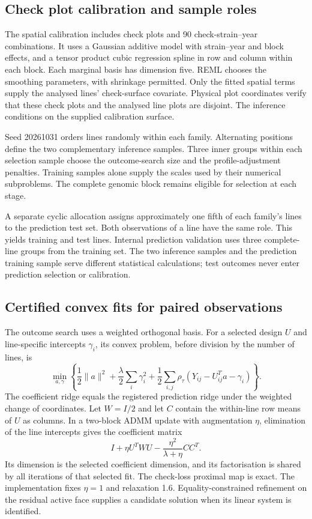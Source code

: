 \subsection{Check plot calibration and sample roles}

The spatial calibration includes \SoyCheckPlots{} check plots and
90 check-strain--year combinations. It uses a Gaussian additive model
with strain--year and block effects, and a tensor product cubic
regression spline in row and column within each block. Each marginal
basis has dimension five. REML chooses the smoothing parameters,
with shrinkage permitted. Only the fitted spatial terms supply the
analysed lines' check-surface covariate. Physical plot coordinates
verify that these check plots and the analysed line plots are disjoint.
The inference conditions on the supplied calibration surface.

Seed 20261031 orders lines randomly within each family. Alternating
positions define the two complementary inference samples. Three
inner groups within each selection sample choose the outcome-search
size and the profile-adjustment penalties. Training samples alone
supply the scales used by their numerical subproblems. The complete
genomic block remains eligible for selection at each stage.

A separate cyclic allocation assigns approximately one fifth of
each family's lines to the prediction test set. Both observations
of a line have the same role. This yields \SoyTrainingLines{} training
and \SoyTestLines{} test lines. Internal prediction validation uses
three complete-line groups from the training set. The two inference
samples and the prediction training sample serve different statistical
calculations; test outcomes never enter prediction selection or
calibration.

\subsection{Certified convex fits for paired observations}

The outcome search uses a weighted orthogonal basis. For a selected
design $U$ and line-specific intercepts $\gamma_i$, its convex problem,
before division by the number of lines, is
\[
 \min_{a,\gamma}\left\{
 \frac12\lVert a\rVert^2+\frac\lambda2\sum_i\gamma_i^2
 +\frac12\sum_{i,j}\rho_\tau(Y_{ij}-U_{ij}^Ta-\gamma_i)
 \right\}.
\]
The coefficient ridge equals the registered prediction ridge under
the weighted change of coordinates. Let $W=I/2$ and let $C$ contain
the within-line row means of $U$ as columns. In a two-block ADMM
update with augmentation $\eta$, elimination of the line intercepts
gives the coefficient matrix
\[
 I+\eta U^TWU-\frac{\eta^2}{\lambda+\eta}CC^T.
\]
Its dimension is the selected coefficient dimension, and its
factorisation is shared by all iterations of that selected fit.
The check-loss proximal map is exact. The implementation fixes
$\eta=1$ and relaxation 1.6. Equality-constrained refinement on the
residual active face supplies a candidate solution when its linear
system is identified.

